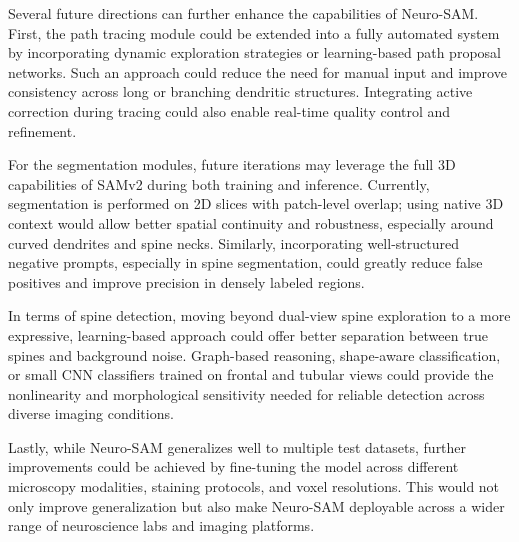 Several future directions can further enhance the capabilities of Neuro-\gls{SAM}. First, the path tracing module could be extended into a fully automated system by incorporating dynamic exploration strategies or learning-based path proposal networks. Such an approach could reduce the need for manual input and improve consistency across long or branching dendritic structures. Integrating active correction during tracing could also enable real-time quality control and refinement.

For the segmentation modules, future iterations may leverage the full 3D capabilities of \gls{SAMv2} during both training and inference. Currently, segmentation is performed on 2D slices with patch-level overlap; using native 3D context would allow better spatial continuity and robustness, especially around curved dendrites and spine necks. Similarly, incorporating well-structured negative prompts, especially in spine segmentation, could greatly reduce false positives and improve precision in densely labeled regions.

In terms of spine detection, moving beyond dual-view spine exploration to a more expressive, learning-based approach could offer better separation between true spines and background noise. Graph-based reasoning, shape-aware classification, or small CNN classifiers trained on frontal and tubular views could provide the nonlinearity and morphological sensitivity needed for reliable detection across diverse imaging conditions.

Lastly, while Neuro-\gls{SAM} generalizes well to multiple test datasets, further improvements could be achieved by fine-tuning the model across different microscopy modalities, staining protocols, and voxel resolutions. This would not only improve generalization but also make Neuro-\gls{SAM} deployable across a wider range of neuroscience labs and imaging platforms.